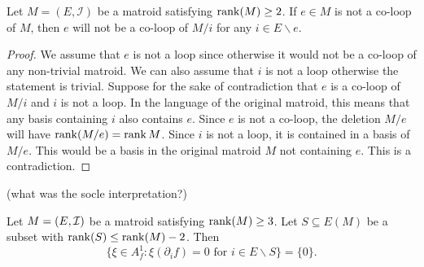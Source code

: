 \documentclass{puthesis-UG}
\begin{document}
\begin{lem} \label{contracting-stays-not-a-coloop}
	Let $M = (E, \mathcal{I})$ be a matroid satisfying $\operatorname{rank} (M) \geq 2$. If $e \in M$ is not a co-loop of $M$, then $e$ will not be a co-loop of $M / i$ for any $i \in E \backslash e$. 
\end{lem}

\begin{proof}
	We assume that $e$ is not a loop since otherwise it would not be a co-loop of any non-trivial matroid. We can also assume that $i$ is not a loop otherwise the statement is trivial. Suppose for the sake of contradiction that $e$ is a co-loop of $M/i$ and $i$ is not a loop. In the language of the original matroid, this means that any basis containing $i$ also contains $e$. Since $e$ is not a co-loop, the deletion $M / e$ will have $\operatorname{rank} (M / e) = \operatorname{rank} M$. Since $i$ is not a loop, it is contained in a basis of $M / e$. This would be a basis in the original matroid $M$ not containing $e$. This is a contradiction. 
\end{proof}

(what was the socle interpretation?)
\begin{thm} \label{socle-socle-socle}
	Let $M = (E, \mathcal{I})$ be a matroid satisfying $\operatorname{rank} (M) \geq 3$. Let $S \subseteq E(M)$ be a subset with $\operatorname{rank} (S) \leq \operatorname{rank} (M)-2$. Then 
	\[
		\{\xi \in A_f^1 : \xi (\partial_i f) = 0 \text{ for } i \in E \backslash S\} = \{0\}.
	\]
\end{thm}
\end{document}
